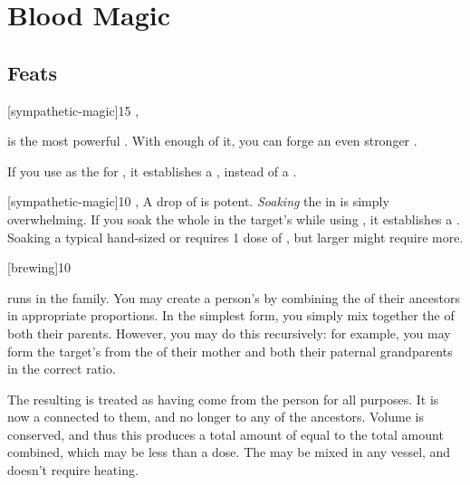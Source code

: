 \chapter{Blood Magic}

\section{Feats}

[sympathetic-magic]{15}{
	,
}{
	 is the most powerful .
	With enough of it, you can forge an even stronger {\symlink}.
	
	If you use  as the  for , it establishes a {\standardsymlink}, instead of a {\weaksymlink}.
}

[sympathetic-magic]{10}{
	,
}{
	A drop of  is potent.
	\emph{Soaking} the {\symbol} in  is simply overwhelming.
	If you soak the whole {\symbol} in the target's  while using , it establishes a {\strongsymlink}.
	Soaking a typical hand-sized  or  requires 1 dose of , but larger {\symbols} might require more.
}

[brewing]{10}{
	\noprereq
}{
	 runs in the family.
	You may create a person's  by combining the  of their ancestors in appropriate proportions.
	In the simplest form, you simply mix together the  of both their parents.
	However, you may do this recursively: for example, you may form the target's  from the  of their mother and both their paternal grandparents in the correct ratio.
	
	The resulting  is treated as having come from the person for all purposes.
	It is now a  connected to them, and no longer to any of the ancestors.
	Volume is conserved, and thus this produces a total amount of  equal to the total amount combined, which may be less than a dose.
	The  may be mixed in any vessel, and doesn't require heating.
}

